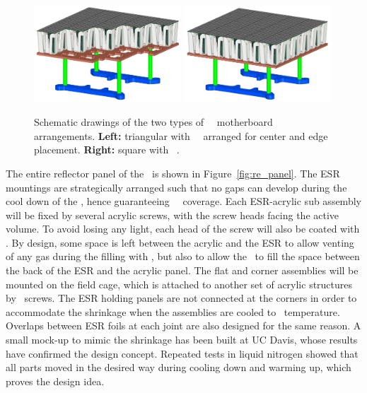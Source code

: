 \begin{figure}[t!]
\includegraphics[width=0.49\textwidth]{./Figures/MB_TRB.PNG}
\includegraphics[width=0.49\textwidth]{./Figures/MB_SQB.PNG}
\caption[\DSks\ \DSkPdm\ motherboard designs]{Schematic drawings of the two types of \DSks\ \DSkPdm\ motherboard arrangements.  {\bf Left:} triangular with \DSkTRBPdmsNumber\ \DSkPdms\ arranged for center and edge placement.  {\bf Right:} square with \DSkSQBPdmsNumber\ \DSkPdms.}
\label{fig:3D-TRB-SQB}
\end{figure}

The entire reflector panel of the \TPC\ is shown in Figure~\ref{fig:re_panel}. The ESR mountings are strategically arranged such that no gaps can develop during the cool down of the \TPC, hence guaranteeing \DSkTPBCoverage\ \TPB\ coverage. Each ESR-acrylic sub assembly will be fixed by several acrylic screws, with the screw heads facing the active volume. To avoid losing any light, each head of the screw will also be coated with \TPB. By design, some space is left between the acrylic and the ESR to allow venting of any gas during the filling with \LAr, but also to allow the \LAr\ to fill the space between the back of the ESR and the acrylic panel. The flat and corner assemblies will be mounted on the field cage, which is attached to another set of acrylic structures by \PTFE\ screws. The ESR holding panels are not connected at the corners in order to accommodate the shrinkage when the assemblies are cooled to \LAr\ temperature. Overlaps between ESR foils at each joint are also designed for the same reason. A small mock-up to mimic the shrinkage has been built at UC Davis, whose results have confirmed the design concept. Repeated tests in liquid nitrogen showed that all parts moved in the desired way during cooling down and warming up, which proves the design idea.

